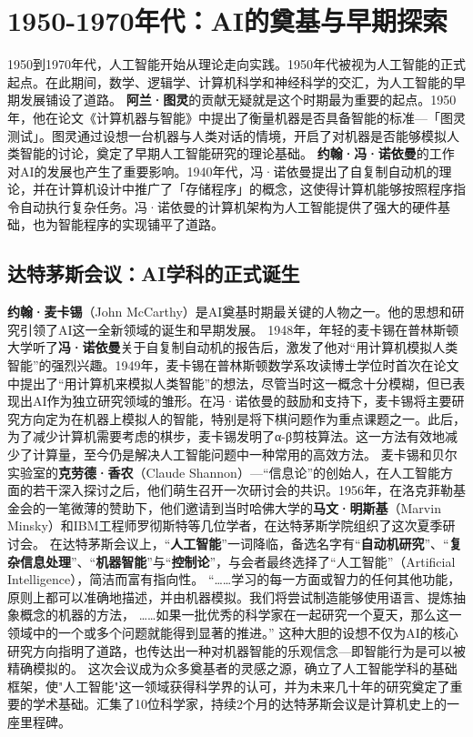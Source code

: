 \section{1950-1970年代：AI的奠基与早期探索}

1950到1970年代，人工智能开始从理论走向实践。1950年代被视为人工智能的正式起点。在此期间，数学、逻辑学、计算机科学和神经科学的交汇，为人工智能的早期发展铺设了道路。
{\bf 阿兰·图灵}的贡献无疑就是这个时期最为重要的起点。1950年，他在论文《计算机器与智能》中提出了衡量机器是否具备智能的标准---「图灵测试」。图灵通过设想一台机器与人类对话的情境，开启了对机器是否能够模拟人类智能的讨论，奠定了早期人工智能研究的理论基础。
{\bf 约翰·冯·诺依曼}的工作对AI的发展也产生了重要影响。1940年代，冯·诺依曼提出了自复制自动机的理论，并在计算机设计中推广了「存储程序」的概念，这使得计算机能够按照程序指令自动执行复杂任务。冯·诺依曼的计算机架构为人工智能提供了强大的硬件基础，也为智能程序的实现铺平了道路。

\subsection{达特茅斯会议：AI学科的正式诞生}

{\bf 约翰·麦卡锡}（John McCarthy）是AI奠基时期最关键的人物之一。他的思想和研究引领了AI这一全新领域的诞生和早期发展。
1948年，年轻的麦卡锡在普林斯顿大学听了{\bf 冯·诺依曼}关于自复制自动机的报告后，激发了他对“用计算机模拟人类智能”的强烈兴趣。1949年，麦卡锡在普林斯顿数学系攻读博士学位时首次在论文中提出了“用计算机来模拟人类智能”的想法，尽管当时这一概念十分模糊，但已表现出AI作为独立研究领域的雏形。在冯·诺依曼的鼓励和支持下，麦卡锡将主要研究方向定为在机器上模拟人的智能，特别是将下棋问题作为重点课题之一。此后，为了减少计算机需要考虑的棋步，麦卡锡发明了α-β剪枝算法。这一方法有效地减少了计算量，至今仍是解决人工智能问题中一种常用的高效方法。
麦卡锡和贝尔实验室的{\bf 克劳德·香农}（Claude Shannon）---“信息论”的创始人，在人工智能方面的若干深入探讨之后，他们萌生召开一次研讨会的共识。1956年，在洛克菲勒基金会的一笔微薄的赞助下，他们邀请到当时哈佛大学的{\bf 马文·明斯基}（Marvin Minsky）和IBM工程师罗彻斯特等几位学者，在达特茅斯学院组织了这次夏季研讨会。
在达特茅斯会议上，“{\bf 人工智能}”一词降临，备选名字有“{\bf 自动机研究}”、“{\bf 复杂信息处理}”、“{\bf 机器智能}”与“{\bf 控制论}”，与会者最终选择了“人工智能”（Artificial Intelligence），简洁而富有指向性。
“……学习的每一方面或智力的任何其他功能，原则上都可以准确地描述，并由机器模拟。我们将尝试制造能够使用语言、提炼抽象概念的机器的方法，
……如果一批优秀的科学家在一起研究一个夏天，那么这一领域中的一个或多个问题就能得到显著的推进。”
这种大胆的设想不仅为AI的核心研究方向指明了道路，也传达出一种对机器智能的乐观信念---即智能行为是可以被精确模拟的。
这次会议成为众多奠基者的灵感之源，确立了人工智能学科的基础框架，使"人工智能"这一领域获得科学界的认可，并为未来几十年的研究奠定了重要的学术基础。汇集了10位科学家，持续2个月的达特茅斯会议是计算机史上的一座里程碑。

